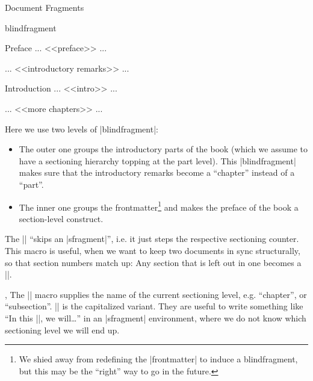 \begin{sfragment}{Document Fragments}
\begin{environment}{blindfragment}
\begin{latexcode}
\begin{blindfragment}
\begin{blindfragment}
\begin{frontmatter}
\maketitle\newpage
\begin{sfragment}{Preface}
... <<preface>> ...
\end{sfragment}
\clearpage\setcounter{tocdepth}{4}\tableofcontents\clearpage
\end{frontmatter}
\end{blindfragment}
... <<introductory remarks>> ...
\end{blindfragment}
\begin{sfragment}{Introduction}
... <<intro>> ...
\end{sfragment}
... <<more chapters>> ... 


\end{latexcode}

Here we use two levels of |blindfragment|:
\begin{itemize}
\item The outer one groups the introductory parts of the book (which we assume to have a
  sectioning hierarchy topping at the part level). This |blindfragment| makes sure that
  the introductory remarks become a ``chapter'' instead of a ``part''.
\item The inner one groups the frontmatter\footnote{We shied away from redefining the
    |frontmatter| to induce a blindfragment, but this may be the ``right'' way to go in
    the future.} and makes the preface of the book a section-level construct.
\end{itemize}
\end{environment}

\begin{function}{\skipfragment}
  The |\skipfragment| ``skips an |sfragment|'', i.e. it just steps the respective sectioning
  counter. This macro is useful, when we want to keep two documents in sync structurally,
  so that section numbers match up: Any section that is left out in one becomes a
  |\skipfragment|.
\end{function}

\begin{function}{\currentsectionlevel,\CurrentSectionLevel}
  The |\currentsectionlevel| macro supplies the name of the current sectioning level,
  e.g. ``chapter'', or ``subsection''. |\CurrentSectionLevel| is the capitalized
  variant. They are useful to write something like ``In this |\currentsectionlevel|, we
  will\ldots'' in an |sfragment| environment, where we do not know which sectioning level we
  will end up.
\end{function}
\end{sfragment}  


